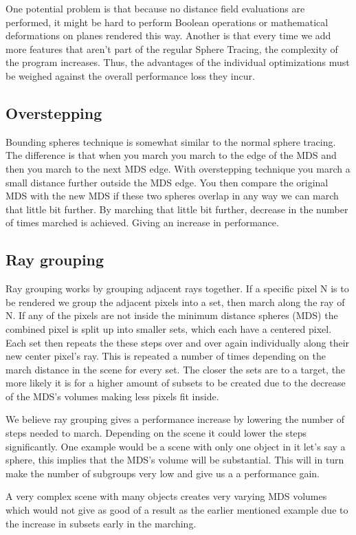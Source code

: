 			One potential problem is that because no distance field evaluations 
			are performed, it might be hard to perform Boolean operations or 
			mathematical deformations on planes rendered this way. Another is 
			that every time we add more features that aren't part of the regular 
			Sphere Tracing, the complexity of the program increases. Thus, the 
			advantages of the individual optimizations must be weighed against 
			the overall performance loss they incur. 

		\subsection{Overstepping}

			Bounding spheres technique is somewhat similar to the normal sphere
			tracing. The difference is that when you march you march to the
			edge of the MDS and then you march to the next MDS edge. With
			overstepping technique you march a small distance further
			outside the MDS edge. You then compare the original MDS with the
			new MDS if these two spheres overlap in any way we can march that
			little bit further. By marching that little bit further, decrease
			in the number of times marched is achieved. Giving an increase in
			performance. 

			
		\subsection{Ray grouping}
		
			Ray grouping works by grouping adjacent rays together.  If a specific
			pixel N is to be rendered we group the adjacent pixels into a set, then
			march along the ray of N. If any of the pixels are not inside the minimum
			distance spheres (MDS) the combined pixel is split up into smaller sets,
			which each have a centered pixel. Each set then repeats the these steps
			over and over again individually along their new center pixel's ray.
			This is repeated a number of times depending on the march distance in the
			scene for every set. The closer the sets are to a target, the more likely
			it is for a higher amount of subsets to be created due to the decrease of
			the MDS's volumes making less pixels fit inside.
			
			We believe ray grouping gives a performance increase by lowering the
			number of steps needed to march. Depending on the scene it could lower
			the steps significantly. One example would be a scene with only one
			object in it let's say a sphere, this implies that the MDS's volume will
			be substantial. This will in turn make the number of subgroups very low
			and give us a a performance gain. 
			
			A very complex scene with many objects creates very varying MDS volumes
			which would not give as good of a result as the earlier mentioned example
			due to the increase in subsets early in the marching.
			
